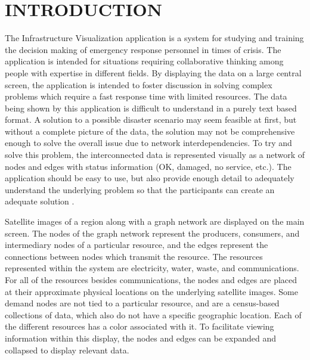 
 
\chapter{INTRODUCTION}
\label{chapter:intro}

The Infrastructure Visualization application is a system for studying and training the decision making of emergency response personnel in times of crisis. The application is intended for situations requiring collaborative thinking among people with expertise in different fields. By displaying the data on a large central screen, the application is intended to foster discussion in solving complex problems which require a fast response time with limited resources. The data being shown by this application is difficult to understand in a
purely text based format. A solution to a possible disaster scenario may seem feasible at first, but without a complete picture of the data, the solution may not be comprehensive enough to solve the overall issue due to network interdependencies. To try and solve this problem, the interconnected data is represented visually as a network of nodes and edges with status information (OK, damaged, no service, etc.). The application should be easy to use, but also provide enough detail to adequately understand the underlying problem so that the participants can create an
adequate solution \cite{Mendonca2014}.

Satellite images of a region along with a graph network are displayed on the main screen. The nodes of the graph network represent the producers, consumers, and intermediary nodes of a particular resource, and the edges represent the connections between nodes which transmit the resource. The resources represented within the system are electricity, water, waste, and communications. For all of the resources besides communications, the nodes and edges are placed at their approximate
physical locations on the underlying satellite images. Some demand nodes are not tied to a particular resource, and are a census-based collections of data, which also do not have a specific geographic location. Each of the different resources has a color associated with it. To facilitate viewing information within this display, the nodes and edges can be expanded and collapsed to display relevant data. 

